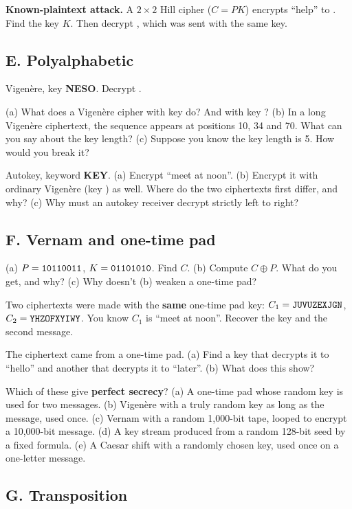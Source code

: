 \q \textbf{Known-plaintext attack.} A $2\times2$ Hill cipher ($C = PK$) encrypts ``help'' to . Find the key $K$. Then decrypt , which was sent with the same key.

\subsection*{E. Polyalphabetic}

\q Vigen\`ere, key \textbf{NESO}. Decrypt .

\q (a) What does a Vigen\`ere cipher with key  do? And with key ?
(b) In a long Vigen\`ere ciphertext, the sequence  appears at positions 10, 34 and 70. What can you say about the key length?
(c) Suppose you know the key length is 5. How would you break it?

\q Autokey, keyword \textbf{KEY}. (a) Encrypt ``meet at noon''.
(b) Encrypt it with ordinary Vigen\`ere (key ) as well. Where do the two ciphertexts first differ, and why?
(c) Why must an autokey receiver decrypt strictly left to right?

\subsection*{F. Vernam and one-time pad}

\q (a) $P = \texttt{10110011}$, $K = \texttt{01101010}$. Find $C$. (b) Compute $C \oplus P$. What do you get, and why? (c) Why doesn't (b) weaken a one-time pad?

\q Two ciphertexts were made with the \textbf{same} one-time pad key:
$C_1 = \texttt{JUVUZEXJGN}$, $C_2 = \texttt{YHZOFXYIWY}$. You know $C_1$ is ``meet at noon''. Recover the key and the second message.

\q The ciphertext  came from a one-time pad. (a) Find a key that decrypts it to ``hello'' and another that decrypts it to ``later''. (b) What does this show?

\q Which of these give \textbf{perfect secrecy}?
(a) A one-time pad whose random key is used for two messages.
(b) Vigen\`ere with a truly random key as long as the message, used once.
(c) Vernam with a random 1,000-bit tape, looped to encrypt a 10,000-bit message.
(d) A key stream produced from a random 128-bit seed by a fixed formula.
(e) A Caesar shift with a randomly chosen key, used once on a one-letter message.

\subsection*{G. Transposition}

